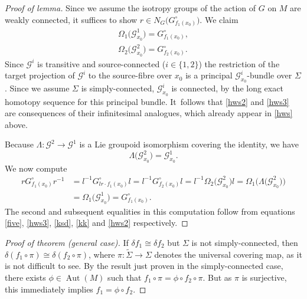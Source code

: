 \documentclass[10pt,a4paper]{amsart}
\numberwithin{equation}{section}
\DeclareMathOperator{\automorphism}{Aut}
\begin{document}
\begin{proof}[Proof of lemma] Since we assume the isotropy groups of
the action of $G$ on $M$ are weakly connected, it suffices to show $r
\in N_G\big(G_{f_1(x_0)}^\circ\big)$. We claim
 \begin{gather}
 \Omega_1\big({\mathcal G}^1_{x_0}\big)=G_{f_1(x_0)}^\circ ,\label{hws2}
 \\
\Omega_2\big({\mathcal G}^2_{x_0}\big)=G_{f_2(x_0)}^\circ.\label{hws3}
 \end{gather}
 Since ${\mathcal G}^i$ is transitive and
source-connected ($i \in \{1,2\}$) the restriction of the target
projection of ${\mathcal G}^i$ to the source-fibre over $x_0$ is a
principal ${\mathcal G}^i_{x_0}$-bundle over $\Sigma $. Since we
assume $\Sigma $ is simply-connected, ${\mathcal G}^i_{x_0}$ is
connected, by the long exact homotopy sequence for this principal
bundle. It~follows that \eqref{hws2} and \eqref{hws3} are consequences
of their infinitesimal analogues, which already appear in \eqref{hws}
above.

 Because $\Lambda \colon {\mathcal G}^2 \rightarrow {\mathcal G}^1$
is a Lie groupoid isomorphism covering the identity, we have
 \begin{equation}
 \Lambda \big({\mathcal G}^2_{x_0}\big) ={\mathcal G}^1_{x_0}.\label{kk}
 \end{equation}
 We now compute
 \begin{align*}
 r G_{f_1(x_0)}^\circ r^{-1} &= l^{-1}G_{lr \cdot
f_1(x_0)}^\circ l = l^{-1}G_{f_2(x_0)}^\circ l=l^{-1} \Omega_2
\big({\mathcal G}^2_{x_0}\big)l = \Omega_1
\big(\Lambda\big({\mathcal G}^2_{x_0}\big)\big)
\\
&=\Omega_1 \big({\mathcal
G}^1_{x_0}\big)=G_{f_1(x_0)}^\circ.
 \end{align*}
 The second and subsequent equalities in this
computation follow from equations \eqref{five}, \eqref{hws3},
\eqref{ksd}, \eqref{kk} and \eqref{hws2} respectively.
\end{proof}

\begin{proof}[Proof of theorem {\normalfont(general case)}]\sloppy If $\delta f_1 \cong
\delta f_2$ but $\Sigma $ is not simply-connected, then \mbox{$\delta(f_1
\circ \pi)\cong \delta(f_2 \circ \pi)$}, where $\pi \colon \tilde
\Sigma \rightarrow \Sigma $ denotes the universal covering map, as it
is not difficult to see. By the result just proven in the
simply-connected case, there exists $\phi \in \automorphism(M)$ such
that $f_1 \circ \pi = \phi \circ f_2 \circ \pi $. But as $\pi $ is
surjective, this immediately implies $f_1 = \phi \circ f_2 $.
\end{proof}
\end{document}
